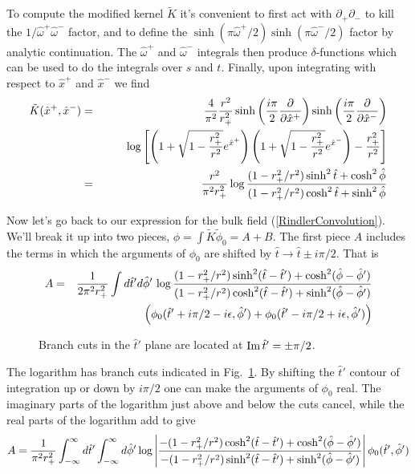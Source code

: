 \documentclass[12pt]{article}
\newcommand{\be}{\begin{equation}}
\newcommand{\ee}{\end{equation}}
\newcommand{\beas}{\begin{eqnarray*}}
\newcommand{\eeas}{\end{eqnarray*}}
\newcommand{\hw}{\hat{\omega}}
\newcommand{\htt}{\hat{t}}
\newcommand{\hp}{\hat{\phi}}
\newcommand{\hx}{\hat{x}}
\begin{document}
To compute the modified kernel $\tilde{K}$ it's convenient to first
act with $\partial_+ \partial_-$ to kill the $1/\hw^+ \hw^-$ factor,
and to define the $\sinh(\pi\hw^+/2) \sinh(\pi\hw^-/2)$ factor by
analytic continuation.  The $\hw^+$ and $\hw^-$ integrals then produce
$\delta$-functions which can be used to do the integrals over $s$ and
$t$.  Finally, upon integrating with respect to $\hx^+$ and $\hx^-$ we
find
%
\beas
\tilde{K}(\hx^+,\hx^-) & = & {4 \over \pi^2} {r^2 \over r_+^2} \sinh\left({i \pi \over 2} {\partial \over \partial \hx^+}\right)
            \sinh\left({i \pi \over 2} {\partial \over \partial \hx^-}\right) \\
& & \qquad  \log\left[\left(1 + \sqrt{1 - {r_+^2 \over r^2}} e^{\hx^+}\right)
                      \left(1 + \sqrt{1 - {r_+^2 \over r^2}} e^{\hx^-}\right)
                      - {r_+^2 \over r^2}\right] \\
& = & {r^2 \over \pi^2 r_+^2} \log { (1 - r_+^2 / r^2) \sinh^2 \htt + \cosh^2 \hp \over (1 - r_+^2 / r^2) \cosh^2 \htt + \sinh^2 \hp }
\eeas
%

Now let's go back to our expression for the bulk field
(\ref{RindlerConvolution}).  We'll break it up into two pieces, $\phi
= \int \tilde{K} \tilde{\phi}_0 = A + B$.  The first piece $A$
includes the terms in which the arguments of $\phi_0$ are shifted by
$\htt \rightarrow \htt \pm i \pi/2$.  That is
%
\beas
A & = & {1 \over 2 \pi^2 r_+^2} \int d\htt' d\hp' \, \log { (1 - r_+^2 / r^2) \sinh^2 (\htt - \htt') + \cosh^2 (\hp - \hp') \over
                                                    (1 - r_+^2 / r^2) \cosh^2 (\htt - \htt') + \sinh^2 (\hp - \hp')} \\
& & \qquad\qquad \left(\phi_0(\htt' + i \pi/2 - i\epsilon,\hp') + \phi_0(\htt' - i \pi/2 + i \epsilon,\hp')\right)
\eeas
%

\begin{figure}
\centerline{}
\caption{Branch cuts in the $\htt'$ plane are located at ${\rm Im} \, \htt' = \pm \pi / 2$.}
\label{Tcuts}
\end{figure}

The logarithm has branch cuts indicated in Fig.~\ref{Tcuts}.  By
shifting the $\htt'$ contour of integration up or down by $i \pi/2$
one can make the arguments of $\phi_0$ real.  The imaginary parts of
the logarithm just above and below the cuts cancel, while the real
parts of the logarithm add to give
%
\be
\label{ShiftT}
A = {1 \over \pi^2 r_+^2} \int_{-\infty}^\infty d\htt' \int_{-\infty}^\infty d\hp'
\log \left\vert {- (1 - r_+^2 / r^2) \cosh^2 (\htt - \htt') + \cosh^2 (\hp - \hp') \over
                 - (1 - r_+^2 / r^2) \sinh^2 (\htt - \htt') + \sinh^2 (\hp - \hp')} \right\vert
\phi_0(\htt',\hp')
\ee
%
\end{document}
